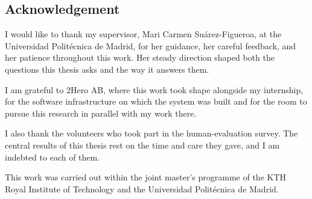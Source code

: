 \vspace*{15em}

\begin{center}
    \section*{Acknowledgement}

    I would like to thank my supervisor, Mari Carmen Su\'arez-Figueroa, at the Universidad Polit\'ecnica de Madrid, for her guidance, her careful feedback, and her patience throughout this work. Her steady direction shaped both the questions this thesis asks and the way it answers them.

    I am grateful to 2Hero AB, where this work took shape alongside my internship, for the software infrastructure on which the system was built and for the room to pursue this research in parallel with my work there.

    I also thank the volunteers who took part in the human-evaluation survey. The central results of this thesis rest on the time and care they gave, and I am indebted to each of them.

    This work was carried out within the joint master's programme of the KTH Royal Institute of Technology and the Universidad Polit\'ecnica de Madrid.

\end{center}

{}

\newpage
